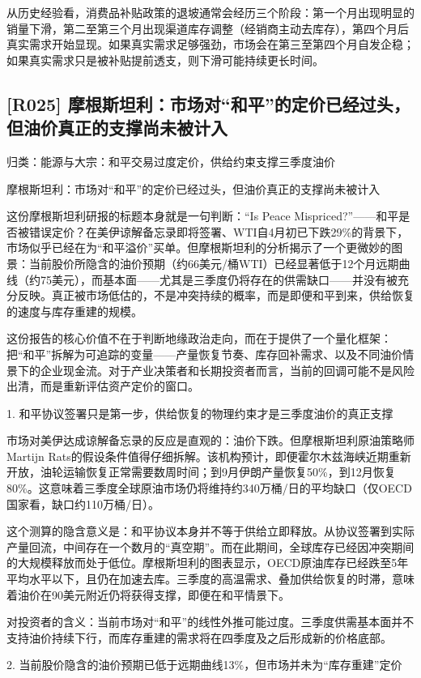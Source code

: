 \documentclass[11pt]{ctexart}
\begin{document}
从历史经验看，消费品补贴政策的退坡通常会经历三个阶段：第一个月出现明显的销量下滑，第二至第三个月出现渠道库存调整（经销商主动去库存），第四个月后真实需求开始显现。如果真实需求足够强劲，市场会在第三至第四个月自发企稳；如果真实需求只是被补贴提前透支，则下滑可能持续更长时间。

\subsection{[R025] 摩根斯坦利：市场对“和平”的定价已经过头，但油价真正的支撑尚未被计入}
{\small\color{refgray}归类：能源与大宗：和平交易过度定价，供给约束支撑三季度油价}

摩根斯坦利：市场对“和平”的定价已经过头，但油价真正的支撑尚未被计入

这份摩根斯坦利研报的标题本身就是一句判断：“Is Peace Mispriced?”——和平是否被错误定价？在美伊谅解备忘录即将签署、WTI自4月初已下跌29\%的背景下，市场似乎已经在为“和平溢价”买单。但摩根斯坦利的分析揭示了一个更微妙的图景：当前股价所隐含的油价预期（约66美元/桶WTI）已经显著低于12个月远期曲线（约75美元），而基本面——尤其是三季度仍将存在的供需缺口——并没有被充分反映。真正被市场低估的，不是冲突持续的概率，而是即便和平到来，供给恢复的速度与库存重建的规模。

这份报告的核心价值不在于判断地缘政治走向，而在于提供了一个量化框架：把“和平”拆解为可追踪的变量——产量恢复节奏、库存回补需求、以及不同油价情景下的企业现金流。对于产业决策者和长期投资者而言，当前的回调可能不是风险出清，而是重新评估资产定价的窗口。

1. 和平协议签署只是第一步，供给恢复的物理约束才是三季度油价的真正支撑

市场对美伊达成谅解备忘录的反应是直观的：油价下跌。但摩根斯坦利原油策略师Martijn Rats的假设条件值得仔细拆解。该机构预计，即便霍尔木兹海峡近期重新开放，油轮运输恢复正常需要数周时间；到9月伊朗产量恢复50\%，到12月恢复80\%。这意味着三季度全球原油市场仍将维持约340万桶/日的平均缺口（仅OECD国家看，缺口约110万桶/日）。

这个测算的隐含意义是：和平协议本身并不等于供给立即释放。从协议签署到实际产量回流，中间存在一个数月的“真空期”。而在此期间，全球库存已经因冲突期间的大规模释放而处于低位。摩根斯坦利的图表显示，OECD原油库存已经跌至5年平均水平以下，且仍在加速去库。三季度的高温需求、叠加供给恢复的时滞，意味着油价在90美元附近仍将获得支撑，即便在和平情景下。

对投资者的含义：当前市场对“和平”的线性外推可能过度。三季度供需基本面并不支持油价持续下行，而库存重建的需求将在四季度及之后形成新的价格底部。

2. 当前股价隐含的油价预期已低于远期曲线13\%，但市场并未为“库存重建”定价
\end{document}
